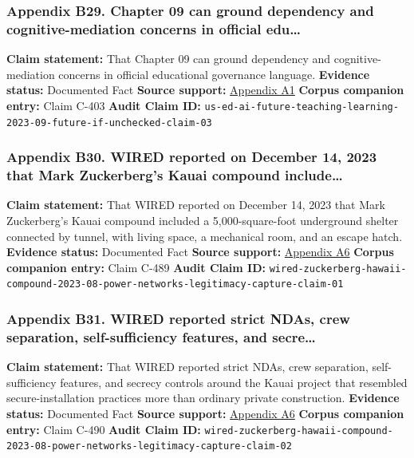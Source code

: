 \documentclass[
  american,
  11pt,
  letterpaper,
]{article}
\begin{document}
\subsubsection{Appendix B29. Chapter 09 can ground dependency and
cognitive-mediation concerns in official
edu\ldots{}}\label{appendix-b29-chapter-09-can-ground-dependency-and-cognitive-mediation-concerns-in-official-edu}

\textbf{Claim statement:} That Chapter 09 can ground dependency and
cognitive-mediation concerns in official educational governance
language. \textbf{Evidence status:} Documented Fact \textbf{Source
support:}
\hyperref[appendix-a1-artificial-intelligence-and-the-future-of-teaching-and-learning-insights-and-recommendations]{Appendix
A1} \textbf{Corpus companion entry:} Claim C-403 \textbf{Audit Claim
ID:}
\texttt{us-ed-ai-future-teaching-learning-2023-09-future-if-unchecked-claim-03}

\subsubsection{Appendix B30. WIRED reported on December 14, 2023 that
Mark Zuckerberg's Kauai compound
include\ldots{}}\label{appendix-b30-wired-reported-on-december-14-2023-that-mark-zuckerberg-s-kauai-compound-include}

\textbf{Claim statement:} That WIRED reported on December 14, 2023 that
Mark Zuckerberg's Kauai compound included a 5,000-square-foot
underground shelter connected by tunnel, with living space, a mechanical
room, and an escape hatch. \textbf{Evidence status:} Documented Fact
\textbf{Source support:}
\hyperref[appendix-a6-inside-mark-zuckerbergs-top-secret-hawaii-compound]{Appendix
A6} \textbf{Corpus companion entry:} Claim C-489 \textbf{Audit Claim
ID:}
\texttt{wired-zuckerberg-hawaii-compound-2023-08-power-networks-legitimacy-capture-claim-01}

\subsubsection{Appendix B31. WIRED reported strict NDAs, crew
separation, self-sufficiency features, and
secre\ldots{}}\label{appendix-b31-wired-reported-strict-ndas-crew-separation-self-sufficiency-features-and-secre}

\textbf{Claim statement:} That WIRED reported strict NDAs, crew
separation, self-sufficiency features, and secrecy controls around the
Kauai project that resembled secure-installation practices more than
ordinary private construction. \textbf{Evidence status:} Documented Fact
\textbf{Source support:}
\hyperref[appendix-a6-inside-mark-zuckerbergs-top-secret-hawaii-compound]{Appendix
A6} \textbf{Corpus companion entry:} Claim C-490 \textbf{Audit Claim
ID:}
\texttt{wired-zuckerberg-hawaii-compound-2023-08-power-networks-legitimacy-capture-claim-02}
\end{document}
